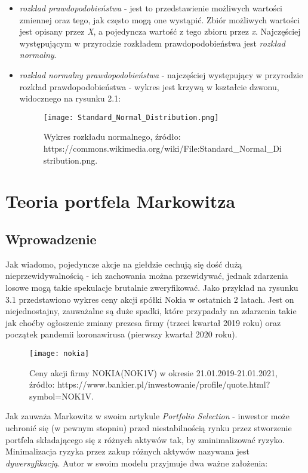 \documentclass[magister]{dyplom}
\begin{document}
\begin{itemize}
\item \textit{rozkład prawdopodobieństwa} - jest to przedstawienie możliwych wartości zmiennej oraz tego, jak często mogą one wystąpić. Zbiór możliwych wartości jest opisany przez \textit{X}, a pojedyncza wartość z tego zbioru przez \textit{x}. Najczęściej występującym w przyrodzie rozkładem prawdopodobieństwa jest \textit{rozkład normalny}.\newline
\newpage
\item \textit{rozkład normalny prawdopodobieństwa} - najczęściej występujący w przyrodzie rozkład prawdopodobieństwa - wykres jest krzywą w kształcie dzwonu, widocznego na rysunku 2.1:
\begin{figure}[h]
	\centering
	\texttt{[image: Standard\_Normal\_Distribution.png]}
	\caption{Wykres rozkładu normalnego, źródło:\newline
		https://commons.wikimedia.org/wiki/File:Standard\_Normal\_Distribution.png.}
\end{figure}
\end{itemize}
\chapter{Teoria portfela Markowitza}

\section{Wprowadzenie}

Jak wiadomo, pojedyncze akcje na giełdzie cechują się dość dużą nieprzewidywalnością - ich zachowania można przewidywać, jednak zdarzenia losowe mogą takie spekulacje brutalnie zweryfikować. Jako przykład na rysunku 3.1 przedstawiono wykres ceny akcji spółki Nokia w ostatnich 2 latach. Jest on niejednostajny, zauważalne są duże spadki, które przypadały na zdarzenia takie jak choćby ogłoszenie zmiany prezesa firmy (trzeci kwartał 2019 roku) oraz początek pandemii koronawirusa (pierwszy kwartał 2020 roku). 

\begin{figure}[h]
\texttt{[image: nokia]}
\caption{Ceny akcji firmy NOKIA(NOK1V) w okresie 21.01.2019-21.01.2021, źródło:\newline
	https://www.bankier.pl/inwestowanie/profile/quote.html?symbol=NOK1V.}
\end{figure}

Jak zauważa Markowitz w swoim artykule \textit{Portfolio Selection} - inwestor może uchronić się (w pewnym stopniu) przed niestabilnością rynku przez stworzenie portfela składającego się z różnych aktywów tak, by zminimalizować ryzyko\cite{markowitz}. Minimalizacja ryzyka przez zakup różnych aktywów nazywana jest \textit{dywersyfikacją}. Autor w swoim modelu przyjmuje dwa ważne założenia: 
\end{document}
